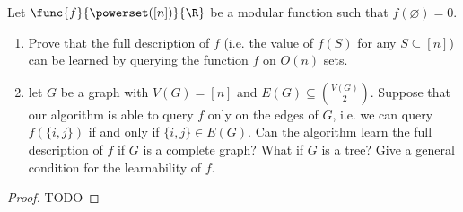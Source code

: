 \documentclass[a4paper, 12pt]{report}
\begin{document}
    \begin{framedprob}{}
        Let $\func{f}{\powerset ([n])}{\R}$ be a modular function such that $f(\varnothing) = 0$.

        \begin{enumerate}
            \item Prove that the full description of $f$ (i.e. the value of $f(S)$ for any $S \subseteq [n]$) can be learned by querying the function $f$ on $O(n)$ sets.
            \item let $G$ be a graph with $V(G) = [n]$ and $E(G) \subseteq \binom{V(G)}{2}$. Suppose that our algorithm is able to query $f$ only on the edges of $G$, i.e. we can query $f(\{i, j\})$ if and only if $\{i, j\} \in E(G)$. Can the algorithm learn the full description of $f$ if $G$ is a complete graph? What if $G$ is a tree? Give a general condition for the learnability of $f$.
        \end{enumerate}
    \end{framedprob}
    
    \begin{proof}
        TODO 
    \end{proof}

    \printbibliography %
\end{document}
